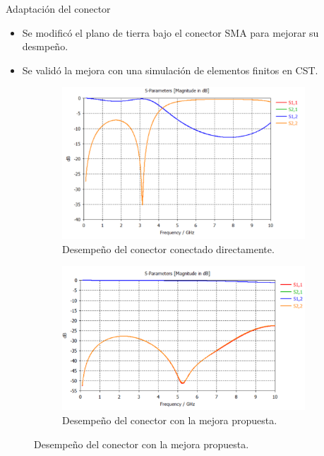 \documentclass{beamer}
\begin{document}
\begin{frame}{Adaptación del conector}

    \begin{block}{}
        \begin{itemize}
            \item Se modificó el plano de tierra bajo el conector SMA para
                mejorar su desmpeño.
            \item Se validó la mejora con una simulación de elementos finitos en
                CST.
        \end{itemize}
    \end{block}

    \begin{figure}
        \centering
        \begin{subfigure}[b]{0.45\textwidth}
            \includegraphics[width=\textwidth]{images/sma_simulation_result.png}
            \caption{Desempeño del conector conectado directamente.}
            \label{fig:sma_simulation_result}
        \end{subfigure}
        \hfill
        \begin{subfigure}[b]{0.45\textwidth}
            \includegraphics[width=\textwidth]{images/sma_improvement_result.png}
            \caption{Desempeño del conector con la mejora propuesta.}
            \label{fig:sma_improvement_result}
        \end{subfigure}
    \end{figure}

\end{frame}
\end{document}

